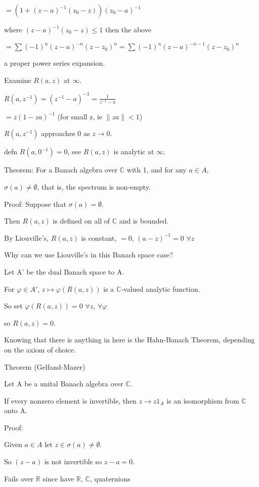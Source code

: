 \documentclass[12pt]{article}
\begin{document}
$=(1 + (z - a)^{-1}(z_0 - z))(z_0 - a)^{-1}$

where $(z - a)^{-1}(z_0 - z) \leq 1$ then the above

$=\sum(-1)^{n}(z - a)^{-n}(z - z_0)^n = \sum(-1)^n(z-a)^{-n-1}(z-z_0)^n$

a proper power series expansion.

\noindent
Examine $R(a, z)$ at $\infty$.

$R(a, z^{-1}) = (z^{-1} - a)^{-1} = \frac{1}{z^{-1} - a}$ 

$ =z(1 - za)^{-1}$ (for small z, ie $\|za\| < 1$)

$R(a, z^{-1})$ approaches 0 as $z \to 0$.

defn $R(a, 0^{-1}) = 0$, see $R(a, z)$ is analytic at $\infty$.

\noindent
Theorem: For a Banach algebra over $\mathds{C}$ with 1, and for any $a \in A$,

$\sigma(a) \neq \emptyset$, that is, the spectrum is non-empty.

\noindent
Proof: Suppose that $\sigma(a) = \emptyset$.

Then $R(a, z)$ is defined on all of $\mathds{C}$ and is bounded.

By Liouville's, $R(a, z)$ is constant, $= 0$, $(a - z)^{-1} = 0$ $ \forall z$

Why can we use Liouville's in this Banach space case?

Let A' be the dual Banach space to A.

For $\varphi \in A'$, $z \mapsto \varphi(R(a, z))$ is a $\mathds{C}$-valued analytic function.

So set $\varphi(R(a, z)) = 0$ $\forall z$, $\forall \varphi$

so $R(a, z) = 0$.

Knowing that there is anything in here is the Hahn-Banach Theorem, depending on the axiom of choice.

\noindent
Theorem (Gelfand-Mazer)

Let A be a unital Banach algebra over $\mathds{C}$.

If every nonzero element is invertible, then $z \to z1_A$ is an isomorphism from $\mathds{C}$ onto A.

\noindent
Proof:

Given $a \in A$ let $z \in \sigma (a) \neq \emptyset$.

So $(z - a)$ is not invertible so $z - a = 0$.

Fails over $\mathds{R}$ since have $\mathds{R}$, $\mathds{C}$, quaternions
\end{document}
